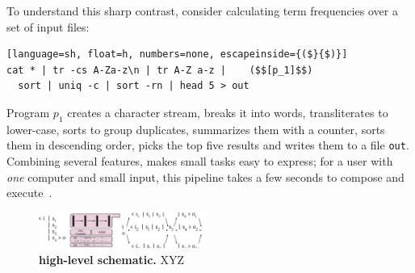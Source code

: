\documentclass[sigplan,10pt,review,anonymous]{acmart}
\newcommand{\ttt}[1]{\texttt{\small #1}}
\begin{document}
To understand this sharp contrast, consider calculating term frequencies over a set of input files:


\begin{lstlisting}[language=sh, float=h, numbers=none, escapeinside={($}{$)}]
cat * | tr -cs A-Za-z\n | tr A-Z a-z |    ($$[p_1]$$)
  sort | uniq -c | sort -rn | head 5 > out
\end{lstlisting}

\noindent
Program $p_1$ creates a character stream, breaks it into words, transliterates to lower-case, sorts to group duplicates, summarizes them with a counter, sorts them in descending order, picks the top five results and writes them to a file \ttt{out}.
Combining several features, \unix makes small tasks easy to express;
  for a user with \emph{one} computer and small input, this pipeline takes a few seconds to compose and execute~\cite{bentley1986literate}.


\begin{figure}[t]
\centering
\includegraphics[width=0.49\textwidth]{./figs/dish_schematic.pdf}
\caption{
  \textbf{\sys high-level schematic.}
	\sys XYZ
}
\label{fig:schematic}
\end{figure}


\end{document}
